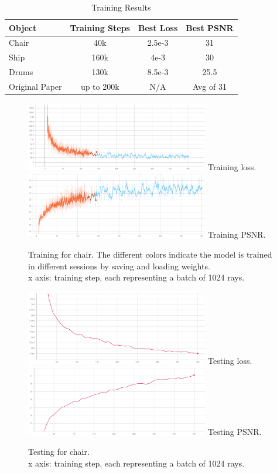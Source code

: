 \begin{table} [h]
\begin{center}
\begin{tabular}{ l c c c }
\toprule
Object & Training Steps & Best Loss & Best PSNR \\
\midrule
Chair & 40k & 2.5e-3 & 31 \\
Ship &  160k & 4e-3 &  30 \\
Drums & 130k &8.5e-3 & 25.5 \\
Original Paper & up to 200k & N/A & Avg of 31 \\
\bottomrule
\end{tabular}
\end{center}
\caption{Training Results}
\label{results}
\end{table}
\begin{figure}[h]
    \centering
    \includegraphics[width=80mm,scale=0.5]{images/chair_training_loss.png}
    Training loss.
    \includegraphics[width=80mm,scale=0.5]{images/chair_training_psnr.png}
    Training PSNR.
    \caption{Training for chair. The different colors indicate the model is trained in different sessions by saving and loading weights. \\ x axis: training step, each representing a batch of 1024 rays.}
    \label{train}
\end{figure}

\begin{figure}[h]
    \centering
    \includegraphics[width=80mm,scale=0.5]{images/chair_loss_tensorboard.png}
    Testing loss.
    \includegraphics[width=80mm,scale=0.5]{images/chair_psnr_tensorboard.png}
    Testing PSNR.
    \caption{Testing for chair.\\ x axis: training step, each representing a batch of 1024 rays.}
    \label{test}
\end{figure}

